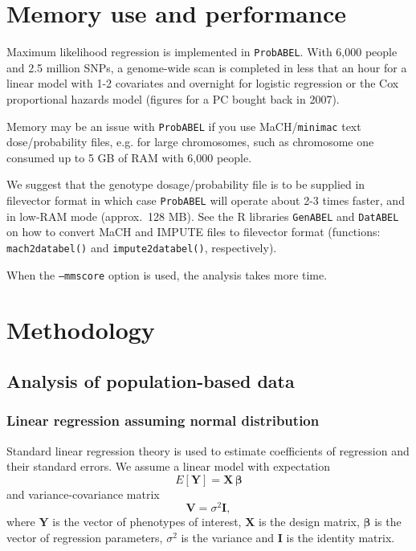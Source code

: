 \documentclass[12pt,a4paper]{article}
\newcommand{\PA}{\texttt{ProbABEL}}
\newcommand{\GA}{\texttt{GenABEL}}
\newcommand{\DA}{\texttt{DatABEL}}
\begin{document}
\section{Memory use and performance}
Maximum likelihood regression is implemented in
\PA{}. With 6,000 people and 2.5 million SNPs, a
genome-wide scan is completed in less that an hour for a linear model
with 1-2 covariates and overnight for logistic regression or the Cox
proportional hazards model (figures for a PC bought back in 2007).

Memory may be an issue with \PA{} if you use MaCH/\texttt{minimac}
text dose/probability files, e.g. for large chromosomes, such as
chromosome one consumed up to 5 GB of RAM with 6,000 people.

We suggest that the genotype dosage/probability file is to be supplied
in filevector format in which case \PA{} will operate about 2-3 times
faster, and in low-RAM mode (approx.~128 MB). See the R libraries
\GA{} and \DA{} on how to convert MaCH and IMPUTE files to filevector
format (functions: \texttt{mach2databel()} and
\texttt{impute2databel()}, respectively).

When the \texttt{--mmscore} option is used, the analysis takes
more time.

\section{Methodology}
\label{sec:methodology}
\subsection{Analysis of population-based data}
\subsubsection{Linear regression assuming normal distribution}
Standard linear regression theory is used to estimate coefficients of
regression and their standard errors. We assume a linear model with
expectation
\begin{equation}
  E[\mathbf{Y}] = \mathbf{X}\, \boldsymbol{\beta}
\label{eq:expectation}
\end{equation}
and variance-covariance matrix
$$
\mathbf{V} = \sigma^2 \mathbf{I},
$$
where $\mathbf{Y}$ is the vector of phenotypes of interest,
$\mathbf{X}$ is the design matrix, $\boldsymbol{\beta}$ is the vector
of regression parameters, $\sigma^2$ is the variance and $\mathbf{I}$
is the identity matrix.
\end{document}
